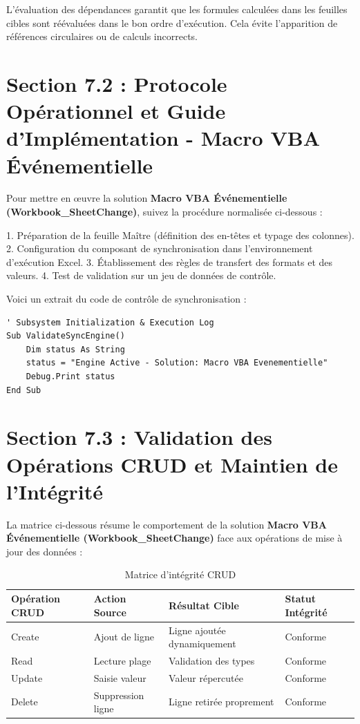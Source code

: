 \documentclass[12pt,a4paper]{report}
\begin{document}
L'évaluation des dépendances garantit que les formules calculées dans les feuilles cibles sont réévaluées dans le bon ordre d'exécution. Cela évite l'apparition de références circulaires ou de calculs incorrects.


\section{Section 7.2 : Protocole Opérationnel et Guide d'Implémentation - Macro VBA Événementielle}
Pour mettre en œuvre la solution \textbf{Macro VBA Événementielle (Workbook\_SheetChange)}, suivez la procédure normalisée ci-dessous :

1. Préparation de la feuille Maître (définition des en-têtes et typage des colonnes).
2. Configuration du composant de synchronisation dans l'environnement d'exécution Excel.
3. Établissement des règles de transfert des formats et des valeurs.
4. Test de validation sur un jeu de données de contrôle.

Voici un extrait du code de contrôle de synchronisation :
\begin{lstlisting}[caption=Code de controle operationnel]
' Subsystem Initialization & Execution Log
Sub ValidateSyncEngine()
    Dim status As String
    status = "Engine Active - Solution: Macro VBA Evenementielle"
    Debug.Print status
End Sub
\end{lstlisting}


\section{Section 7.3 : Validation des Opérations CRUD et Maintien de l'Intégrité}
La matrice ci-dessous résume le comportement de la solution \textbf{Macro VBA Événementielle (Workbook\_SheetChange)} face aux opérations de mise à jour des données :

\begin{table}[h]
\centering
\begin{tabular}{@{}llll@{}}
\toprule
\textbf{Opération CRUD} & \textbf{Action Source} & \textbf{Résultat Cible} & \textbf{Statut Intégrité} \\ \midrule
Create & Ajout de ligne & Ligne ajoutée dynamiquement & Conforme \\
Read & Lecture plage & Validation des types & Conforme \\
Update & Saisie valeur & Valeur répercutée & Conforme \\
Delete & Suppression ligne & Ligne retirée proprement & Conforme \\ \bottomrule
\end{tabular}
\caption{Matrice d'intégrité CRUD}
\end{table}
\end{document}
